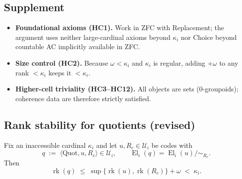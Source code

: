 \documentclass[a4paper,11pt]{article}
\newcommand{\El}{\operatorname{El}}          %
\begin{document}
\subsection*{Supplement}
\begin{itemize}
\item \textbf{Foundational axioms (HC1).}  Work in ZFC with Replacement; the
      argument uses neither large-cardinal axioms beyond $\kappa_i$
      nor Choice beyond countable AC implicitly available in ZFC.
\item \textbf{Size control (HC2).}
      Because $\omega<\kappa_i$ and $\kappa_i$ is regular,
      adding $+\omega$ to any rank $<\kappa_i$ keeps it $<\kappa_i$.
\item \textbf{Higher-cell triviality (HC3–HC12).}
      All objects are sets (0-groupoids); coherence data are therefore
      strictly satisfied.
\end{itemize}

\subsection{Rank stability for quotients (revised)}
\begin{lemma}\label{lem:rank}
Fix an inaccessible cardinal $\kappa_{i}$ and let
$u,R_c\in\mathcal U_{i}$ be codes with
\[
  q\;:=\;\langle\mathrm{Quot},u,R_c\rangle\in\mathcal U_{i},\qquad
  \El_i(q)=\El_i(u)\big/\!\sim_{R_c}.
\]
Then
\[
  \operatorname{rk}(q)
  \;\le\;
  \sup\!\bigl\{\operatorname{rk}(u),\operatorname{rk}(R_c)\bigr\}
  +\omega
  \;<\;\kappa_{i}.
\]
\end{lemma}
\end{document}
